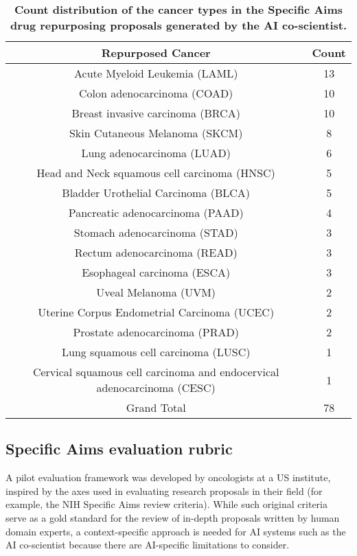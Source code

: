 \begin{table}[htbp!]
\centering
\begin{tabular}{cc}
\toprule
\textbf{Repurposed Cancer} & \textbf{Count} \\
\midrule
Acute Myeloid Leukemia (LAML) & 13 \\
Colon adenocarcinoma (COAD) & 10 \\
Breast invasive carcinoma (BRCA) & 10 \\
Skin Cutaneous Melanoma (SKCM) & 8 \\
Lung adenocarcinoma (LUAD) & 6 \\
Head and Neck squamous cell carcinoma (HNSC) & 5 \\
Bladder Urothelial Carcinoma (BLCA) & 5 \\
Pancreatic adenocarcinoma (PAAD) & 4 \\
Stomach adenocarcinoma (STAD) & 3 \\
Rectum adenocarcinoma (READ) & 3 \\
Esophageal carcinoma (ESCA) & 3 \\
Uveal Melanoma (UVM) & 2 \\
Uterine Corpus Endometrial Carcinoma (UCEC) & 2 \\
Prostate adenocarcinoma (PRAD) & 2 \\
Lung squamous cell carcinoma (LUSC) & 1 \\
Cervical squamous cell carcinoma and endocervical adenocarcinoma (CESC) & 1 \\
\midrule
Grand Total & 78 \\
\bottomrule
\end{tabular}
\vspace{0.1cm}
\caption{\textbf{Count distribution of the cancer types in the Specific Aims drug repurposing proposals generated by the AI co-scientist.} }
\end{table}


\subsection{Specific Aims evaluation rubric}
\label{sec:specific_aims_rubric}
A pilot evaluation framework was developed by oncologists at a US institute, inspired by the axes used in evaluating research proposals in their field (for example, the NIH Specific Aims review criteria). While such original criteria serve as a gold standard for the review of in-depth proposals written by human domain experts, a context-specific approach is needed for AI systems such as the AI co-scientist because there are AI-specific limitations to consider.

